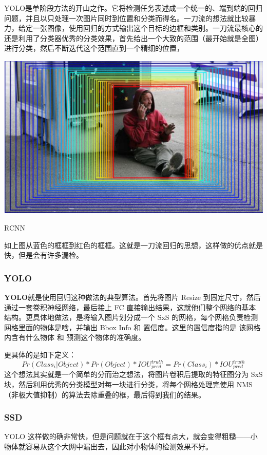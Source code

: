 YOLO是单阶段方法的开山之作。它将检测任务表述成一个统一的、端到端的回归问题，并且以只处理一次图片同时到位置和分类而得名。一刀流的想法就比较暴力，给定一张图像，使用回归的方式输出这个目标的边框和类别。一刀流最核心的还是利用了分类器优秀的分类效果，首先给出一个大致的范围（最开始就是全图）进行分类，然后不断迭代这个范围直到一个精细的位置，
\begin{uscfigure}
	\includegraphics[width=\textwidth]{./Pictures/od_regressor.png}	
	\caption{RCNN}	
\end{uscfigure}
如上图从蓝色的框框到红色的框框。这就是一刀流回归的思想，这样做的优点就是快，但是会有许多漏检。

\subsubsection{YOLO}
\textbf{YOLO}就是使用回归这种做法的典型算法。首先将图片 Resize 到固定尺寸，然后通过一套卷积神经网络，最后接上 FC 直接输出结果，这就他们整个网络的基本结构。更具体地做法，是将输入图片划分成一个 SxS 的网格，每个网格负责检测网格里面的物体是啥，并输出 Bbox Info 和 置信度。这里的置信度指的是 该网格内含有什么物体 和 预测这个物体的准确度。

更具体的是如下定义：
\[
	Pr(Class_i | Object) * Pr(Object) * IOU_{pred}^{truth} = Pr(Class_i) * IOU_{pred}^{truth}
\]
这个想法其实就是一个简单的分而治之想法，将图片卷积后提取的特征图分为 SxS 块，然后利用优秀的分类模型对每一块进行分类，将每个网格处理完使用 NMS （非极大值抑制）的算法去除重叠的框，最后得到我们的结果。
\subsubsection{SSD}
YOLO 这样做的确非常快，但是问题就在于这个框有点大，就会变得粗糙——小物体就容易从这个大网中漏出去，因此对小物体的检测效果不好。

